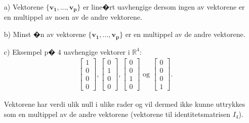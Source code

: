 \documentclass[a4paper, norsk, 12pt]{extarticle}
\begin{document}
\begin{itemize}

\item[a)]
Vektorene $\{\mathbf{v_1}, ..., \mathbf{v_p}\}$ er line�rt uavhengige dersom ingen av vektorene er en multippel av noen av de andre vektorene.

\item[b)]
Minst �n av vektorene $\{\mathbf{v_1}, ..., \mathbf{v_p}\}$ er en multippel av de andre vektorene.

\item[c)]
Eksempel p� $4$ uavhengige vektorer i $\mathbb{R}^4$:
\begin{align*}
\begin{bmatrix}  1 \\  0 \\ 0 \\ 0  \end{bmatrix},
\begin{bmatrix}  0 \\  1 \\ 0 \\ 0  \end{bmatrix},
\begin{bmatrix}  0 \\  0 \\ 1 \\ 0  \end{bmatrix}
\text{ og }
\begin{bmatrix}  0 \\  0 \\ 0 \\ 1  \end{bmatrix}.
\end{align*}

Vektorene har verdi ulik null i ulike rader og vil dermed ikke kunne uttrykkes som en multippel av de andre vektorene (vektorene til identitetsmatrisen $I_4$).
\end{itemize}


\end{document}
